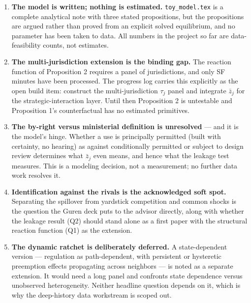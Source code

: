 \documentclass[11pt]{article}
\begin{document}
\begin{enumerate}
\item \textbf{The model is written; nothing is estimated.} \texttt{toy\_model.tex} is a complete
analytical note with three stated propositions, but the propositions are argued rather than proved
from an explicit solved equilibrium, and no parameter has been taken to data. All numbers in the
project so far are data-feasibility counts, not estimates.

\item \textbf{The multi-jurisdiction extension is the binding gap.} The reaction function of
Proposition 2 requires a panel of jurisdictions, and only SF minutes have been processed. The
progress log carries this explicitly as the open build item: construct the multi-jurisdiction
$\tau_j$ panel and integrate $\bar z_j$ for the strategic-interaction layer. Until then Proposition 2
is untestable and Proposition 1's counterfactual has no estimated primitives.

\item \textbf{The by-right versus ministerial definition is unresolved} --- and it is the model's
hinge. Whether a use is principally permitted (built with certainty, no hearing) as against
conditionally permitted or subject to design review determines what $\bar z_j$ even means, and hence
what the leakage test measures. This is a modeling decision, not a measurement; no further data work
resolves it.

\item \textbf{Identification against the rivals is the acknowledged soft spot.} Separating the
spillover from yardstick competition and common shocks is the question the Guren deck puts to the
advisor directly, along with whether the leakage result (Q2) should stand alone as a first paper with
the structural reaction function (Q1) as the extension.

\item \textbf{The dynamic ratchet is deliberately deferred.} A state-dependent version --- regulation
as path-dependent, with persistent or hysteretic preemption effects propagating across neighbors ---
is noted as a separate extension. It would need a long panel and confronts state dependence versus
unobserved heterogeneity. Neither headline question depends on it, which is why the deep-history data
workstream is scoped out.
\end{enumerate}
\end{document}
